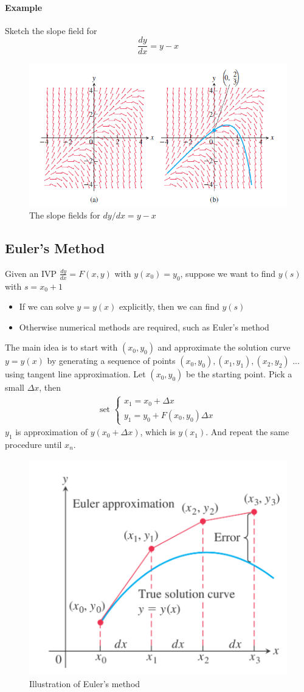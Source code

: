 \documentclass[12pt]{article}
\begin{document}
\paragraph{Example} Sketch the slope field for
\[
    \frac{dy}{dx} = y - x
\]

\begin{figure}[H]
     \centering
     \includegraphics[width = 0.7\linewidth]{Images/slope fields.png}
     \caption{The slope fields for $dy/dx = y - x$}
\end{figure}

\subsection{Euler's Method}
Given an IVP $\frac{dy}{dx} = F(x, y)$ with $y(x_0) = y_0$, suppose we want to find $y(s)$ with $s = x_0 + 1$
\begin{itemize} 
    \item If we can solve $y = y(x)$ explicitly, then we can find $y(s)$
    \item Otherwise numerical methods are required, such as Euler's method
\end{itemize}
The main idea is to start with $(x_0, y_0)$ and approximate the solution curve $y = y(x)$ by generating a sequence of points 
$(x_0, y_0), (x_1, y_1), (x_2, y_2)$ ... using tangent line approximation.
Let $(x_0, y_0)$ be the starting point. Pick a small $\Delta x$, then 
\begin{align*} 
    \textrm{set }\begin{cases} 
        x_1 = x_0 + \Delta x \\ 
        y_1 = y_0 + F(x_0, y_0)\Delta x
    \end{cases} 
\end{align*}
$y_1$ is approximation of $y(x_0 + \Delta x)$, which is $y(x_1)$. And repeat the same procedure until $x_n$.
\begin{figure}[H]
     \centering
     \includegraphics[width = 0.4 \linewidth]{Images/euler method.png}
     \caption{Illustration of Euler's method}
\end{figure}
\end{document}
